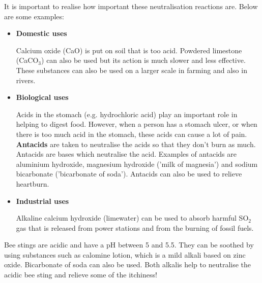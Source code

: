 It is important to realise how important these neutralisation reactions are. Below are some examples:

\begin{itemize}
\item{\textbf{Domestic uses}

Calcium oxide (CaO) is put on soil that is too acid. Powdered limestone (CaCO$_{3}$) can also be used but its action is much slower and less effective. These substances can also be used on a larger scale in farming and also in rivers. }

\item{\textbf{Biological uses}

Acids in the stomach (e.g. hydrochloric acid) play an important role in helping to digest food. However, when a person has a stomach ulcer, or when there is too much acid in the stomach, these acids can cause a lot of pain. \textbf{Antacids} are taken to neutralise the acids so that they don't burn as much. Antacids are bases which neutralise the acid. Examples of antacids are aluminium hydroxide, magnesium hydroxide ('milk of magnesia') and sodium bicarbonate ('bicarbonate of soda'). Antacids can also be used to relieve heartburn.}

\item{\textbf{Industrial uses}

Alkaline calcium hydroxide (limewater) can be used to absorb harmful SO$_{2}$ gas that is released from power stations and from the burning of fossil fuels.
}


\end{itemize}

\begin{IFact}{
Bee stings are acidic and have a pH between 5 and 5.5. They can be soothed by using substances such as calomine lotion, which is a mild alkali based on zinc oxide. Bicarbonate of soda can also be used. Both alkalis help to neutralise the acidic bee sting and relieve some of the itchiness!
}
\end{IFact}

